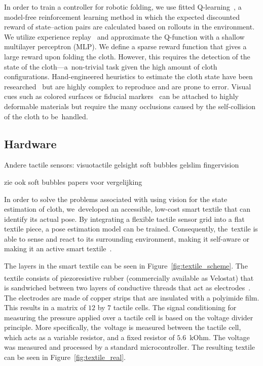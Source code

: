 \documentclass[\home/main.tex]{subfiles}
\begin{document}
In order to train a controller for robotic folding, we use fitted Q-learning~\cite{Watkins1992}, a model-free reinforcement learning method in which the expected discounted reward of state--action pairs are calculated based on rollouts in the environment. We utilize experience replay~\cite{Lin1992} and approximate the Q-function with a shallow multilayer perceptron (MLP). We define a sparse reward function that gives a large reward upon folding the cloth. However, this requires the detection of the state of the cloth---a~non-trivial task given the high amount of cloth configurations. Hand-engineered heuristics to estimate the cloth state have been researched~\cite{Doumanoglou2016} but are highly complex to reproduce and are prone to error. Visual cues such as colored surfaces or fiducial markers~\cite{Bersch2011, Tsurumine2019} can be attached to highly deformable materials but require the many occlusions caused by the self-collision of the cloth to be~handled.

\subsection{Hardware} 

Andere tactile sensors:
    visuotactile
        gelsight
        soft bubbles
        gelslim
        fingervision

    zie ook soft bubbles papers voor vergelijking 





In order to solve the problems associated with using vision for the state estimation of cloth, we~developed an accessible, low-cost smart textile that can identify its actual pose. By integrating a flexible tactile sensor grid into a flat textile piece, a pose estimation model can be trained. Consequently, the~textile is able to sense and react to its surrounding environment, making it self-aware or making it an active smart textile~\cite{Stoppa2014}.

The layers in the smart textile can be seen in Figure~\ref{fig:textile_scheme}. The textile consists of piezoresistive rubber (commercially available as Velostat\textsuperscript{\textregistered}) that is sandwiched between two layers of conductive threads that act as electrodes~\cite{Drimus2014}. The electrodes are made of copper strips that are insulated with a polyimide film. This results in a matrix of $12$ by $7$ tactile cells. The signal conditioning for measuring the pressure applied over a tactile cell is based on the voltage divider principle. More specifically, the~voltage is measured between the tactile cell, which acts as a variable resistor, and a fixed resistor of $5.6$~kOhm. The voltage was measured and processed by a standard microcontroller. The resulting textile can be seen in Figure~\ref{fig:textile_real}.
\end{document}

